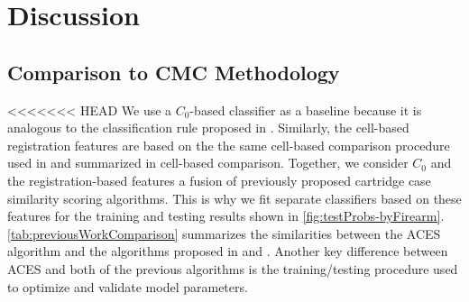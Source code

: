 \documentclass[reprint]{JASA}
\begin{document}
\hypertarget{discussion}{%
\section{Discussion}\label{discussion}}

\hypertarget{comparison-to-cmc-methodology}{%
\subsection{Comparison to CMC
Methodology}\label{comparison-to-cmc-methodology}}

<<<<<<< HEAD
We use a \(C_0\)-based classifier as a baseline because it is analogous
to the classification rule proposed in \citet{zhang_convergence_2021}.
Similarly, the cell-based registration features are based on the the
same cell-based comparison procedure used in \citet{song_proposed_2013}
and summarized in cell-based comparison. Together, we consider \(C_0\)
and the registration-based features a fusion of previously proposed
cartridge case similarity scoring algorithms. This is why we fit
separate classifiers based on these features for the training and
testing results shown in \autoref{fig:testProbs-byFirearm}.
\autoref{tab:previousWorkComparison} summarizes the similarities between
the ACES algorithm and the algorithms proposed in
\citet{zhang_convergence_2021} and \citet{song_proposed_2013}. Another
key difference between ACES and both of the previous algorithms is the
training/testing procedure used to optimize and validate model
parameters.
\end{document}
